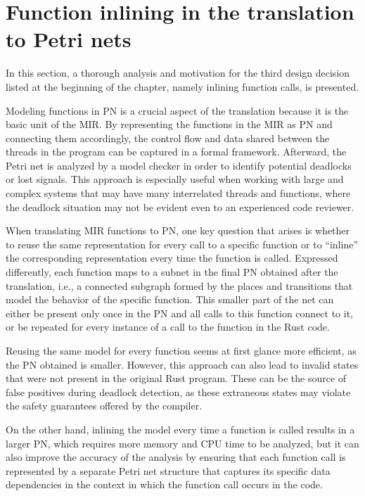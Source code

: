 \section{Function inlining in the translation to Petri nets}
\label{sec:function-inlining}

In this section, a thorough analysis and motivation for the third design decision
listed at the beginning of the chapter, namely inlining function calls, is presented.

Modeling functions in \acrshort{PN} is a crucial aspect of the translation
because it is the basic unit of the \acrshort{MIR}.
By representing the functions in the \acrshort{MIR} as \acrshort{PN} and connecting them accordingly,
the control flow and data shared between the threads in the program
can be captured in a formal framework.
Afterward, the Petri net is analyzed by a model checker
in order to identify potential deadlocks or lost signals.
This approach is especially useful when working with large and complex systems
that may have many interrelated threads and functions,
where the deadlock situation may not be evident even to an experienced code reviewer.

When translating \acrshort{MIR} functions to \acrshort{PN}, one key question that arises is
whether to reuse the same representation for every call to a specific function or
to ``inline'' the corresponding representation every time the function is called.
Expressed differently, each function maps to a subnet
in the final \acrshort{PN} obtained after the translation, i.e.,
a connected subgraph formed by the places and transitions
that model the behavior of the specific function.
This smaller part of the net can either be present only once in the \acrshort{PN}
and all calls to this function connect to it,
or be repeated for every instance of a call to the function in the Rust code.

Reusing the same model for every function seems at first glance more efficient,
as the \acrshort{PN} obtained is smaller.
However, this approach can also lead to invalid states
that were not present in the original Rust program.
These can be the source of false positives during deadlock detection,
as these extraneous states may violate
the safety guarantees offered by the compiler.

On the other hand, inlining the model every time a function is called results in
a larger \acrshort{PN}, which requires more memory and \acrshort{CPU} time to be analyzed,
but it can also improve the accuracy of the analysis by ensuring
that each function call is represented by a separate Petri net structure
that captures its specific data dependencies in the context
in which the function call occurs in the code.


